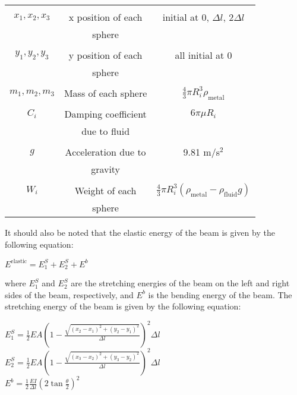 \documentclass[letterpaper, 10 pt, conference]{ieeeconf}  %
\begin{document}
\begin{table}[h]
\begin{center}
\begin{tabular}{|c|c|c|}
& & \\ $x_1, x_2, x_3$ & x position of each & initial at 0, $\Delta l$, $2\Delta l$\\ & sphere & \\
& & \\ $y_1, y_2, y_3$ & y position of each & all initial at 0\\ & sphere & \\
& & \\ $m_1, m_2, m_3$ & Mass of each sphere & $\frac{4}{3}\pi R_i^3 \rho_{\text{metal}}$\\
& & \\ $C_i$ & Damping coefficient& $6 \pi \mu R_i$ \\ &  due to fluid & \\
& & \\ $g$ & Acceleration due to  & 9.81 m/s\(^2\) \\ & gravity & \\
& & \\ $W_i$ & Weight of each & $\frac{4}{3} \pi R_i^3(\rho_{\text{metal}}-\rho_{\text{fluid}}g)$ \\ & sphere & \\
\hline
\end{tabular}
\end{center}
\end{table}

It should also be noted that the elastic energy of the beam is given by the following equation:
\begin{center}
        $E^{\text{elastic}} = E^S_1 + E^S_2 + E^b$
\end{center}
where $E^S_1$ and $E^S_2$ are the stretching energies of the beam on the left and right sides of the beam, respectively, and $E^b$ is the bending energy of the beam. The stretching energy of the beam is given by the following equation:
\begin{center}
        $E^S_1 = \frac{1}{2}EA\left( 1 - \frac{\sqrt{(x_2 - x_1)^2 + (y_2 - y_1)^2 }}{\Delta l}\right)^2 \Delta l$ \\



        $E^S_2 = \frac{1}{2}EA\left( 1 - \frac{\sqrt{(x_3 - x_2)^2 + (y_3 - y_2)^2 }}{\Delta l}\right)^2 \Delta l$ \\



        $E^b = \frac{1}{2} \frac{EI}{\Delta l}\left( 2 \tan{\frac{\theta}{2}} \right)^2$
\end{center}
\end{document}
